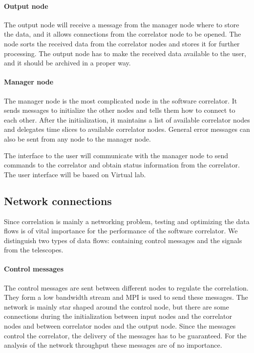 \paragraph{Output node}
The output node will receive a message from the manager node where
to store the data, and it allows connections from the correlator node to
be opened. The node sorts the received data from the correlator nodes
and stores it for further processing. The output node has to make the
received data available to the user, and it should be archived in a
proper way.

\paragraph{Manager node}
The manager node is the most complicated node in the software
correlator. It sends messages to initialize the other nodes and tells
them how to connect to each other. After the initialization, it
maintains a list of available correlator nodes and delegates time
slices to available correlator nodes. General error messages can also
be sent from any node to the manager node.

The interface to the user will communicate with the manager node to
send commands to the correlator and obtain status information from the
correlator. The user interface will be based on Virtual lab.

\subsection{Network connections}
Since correlation is mainly a networking problem, testing and
optimizing the data flows is of vital importance for the performance
of the software correlator. We distinguish two types of data flows:
containing control messages and the signals from the telescopes. 

\paragraph{Control messages}
The control messages are sent between different nodes to regulate the
correlation. They form a low bandwidth stream and MPI is used to send
these messages. The network is mainly star shaped around the control
node, but there are some connections during the initialization between
input nodes and the correlator nodes and between correlator nodes and
the output node. Since the messages control the correlator, the
delivery of the messages has to be guaranteed. For the analysis of the
network throughput these messages are of no importance.


